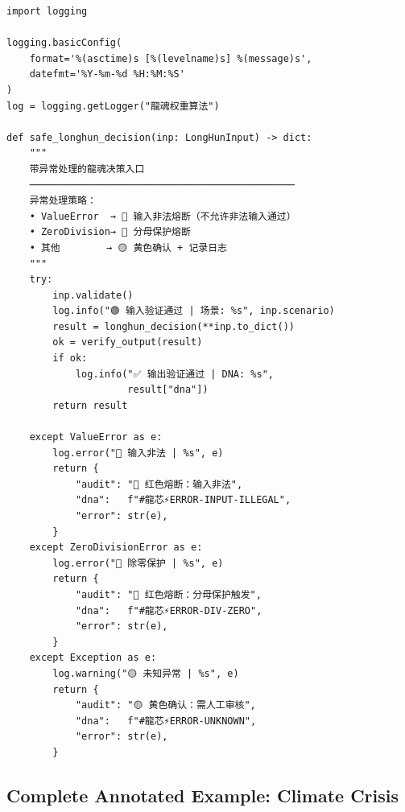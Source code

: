 \documentclass[conference]{IEEEtran}
\begin{document}
\begin{lstlisting}[style=python,
  caption={龍魂异常处理与三色日志},
  label={lst:error}]
import logging

logging.basicConfig(
    format='%(asctime)s [%(levelname)s] %(message)s',
    datefmt='%Y-%m-%d %H:%M:%S'
)
log = logging.getLogger("龍魂权重算法")

def safe_longhun_decision(inp: LongHunInput) -> dict:
    """
    带异常处理的龍魂决策入口
    ──────────────────────────────────────────────
    异常处理策略：
    • ValueError  → 🔴 输入非法熔断（不允许非法输入通过）
    • ZeroDivision→ 🔴 分母保护熔断
    • 其他        → 🟡 黄色确认 + 记录日志
    """
    try:
        inp.validate()
        log.info("🟢 输入验证通过 | 场景: %s", inp.scenario)
        result = longhun_decision(**inp.to_dict())
        ok = verify_output(result)
        if ok:
            log.info("✅ 输出验证通过 | DNA: %s",
                     result["dna"])
        return result

    except ValueError as e:
        log.error("🔴 输入非法 | %s", e)
        return {
            "audit": "🔴 红色熔断：输入非法",
            "dna":   f"#龍芯⚡️ERROR-INPUT-ILLEGAL",
            "error": str(e),
        }
    except ZeroDivisionError as e:
        log.error("🔴 除零保护 | %s", e)
        return {
            "audit": "🔴 红色熔断：分母保护触发",
            "dna":   f"#龍芯⚡️ERROR-DIV-ZERO",
            "error": str(e),
        }
    except Exception as e:
        log.warning("🟡 未知异常 | %s", e)
        return {
            "audit": "🟡 黄色确认：需人工审核",
            "dna":   f"#龍芯⚡️ERROR-UNKNOWN",
            "error": str(e),
        }
\end{lstlisting}

\subsection{Complete Annotated Example: Climate Crisis}
\label{ssec:example}
\end{document}
